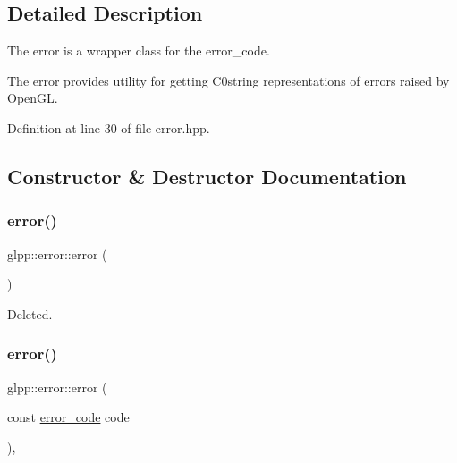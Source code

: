 \subsection{Detailed Description}
The error is a wrapper class for the error\+\_\+code. 

The error provides utility for getting C0string representations of errors raised by Open\+GL. 

Definition at line 30 of file error.\+hpp.



\subsection{Constructor \& Destructor Documentation}
\mbox{\label{classglpp_1_1error_aca53147c703f90cced018e8592ef28ea}} 
\subsubsection{\texorpdfstring{error()}{error()}\hspace{0.1cm}{\footnotesize\ttfamily [1/3]}}
{\footnotesize\ttfamily glpp\+::error\+::error (\begin{DoxyParamCaption}{ }\end{DoxyParamCaption})\hspace{0.3cm}{\ttfamily [delete]}}

Deleted. \mbox{\label{classglpp_1_1error_a622ee219a83b275ea965f74b55e277de}} 
\subsubsection{\texorpdfstring{error()}{error()}\hspace{0.1cm}{\footnotesize\ttfamily [2/3]}}
{\footnotesize\ttfamily glpp\+::error\+::error (\begin{DoxyParamCaption}\item[{const \hyperlink{namespaceglpp_a1fe5e1dcc793337b3958e3cd2352432c}{error\+\_\+code}}]{code }\end{DoxyParamCaption})\hspace{0.3cm}{\ttfamily [explicit]}, {\ttfamily [noexcept]}}



